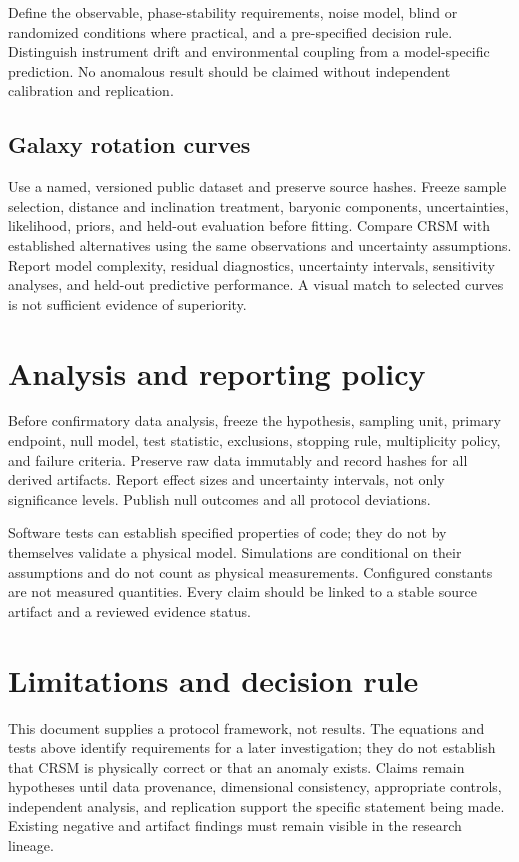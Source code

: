 \documentclass[aps,preprint,superscriptaddress,longbibliography]{revtex4-2}
\begin{document}
Define the observable, phase-stability requirements, noise model, blind or
randomized conditions where practical, and a pre-specified decision rule.
Distinguish instrument drift and environmental coupling from a model-specific
prediction. No anomalous result should be claimed without independent
calibration and replication.

\subsection{Galaxy rotation curves}

Use a named, versioned public dataset and preserve source hashes. Freeze
sample selection, distance and inclination treatment, baryonic components,
uncertainties, likelihood, priors, and held-out evaluation before fitting.
Compare CRSM with established alternatives using the same observations and
uncertainty assumptions. Report model complexity, residual diagnostics,
uncertainty intervals, sensitivity analyses, and held-out predictive
performance. A visual match to selected curves is not sufficient evidence
of superiority.

\section{Analysis and reporting policy}

Before confirmatory data analysis, freeze the hypothesis, sampling unit,
primary endpoint, null model, test statistic, exclusions, stopping rule,
multiplicity policy, and failure criteria. Preserve raw data immutably and
record hashes for all derived artifacts. Report effect sizes and uncertainty
intervals, not only significance levels. Publish null outcomes and all
protocol deviations.

Software tests can establish specified properties of code; they do not by
themselves validate a physical model. Simulations are conditional on their
assumptions and do not count as physical measurements. Configured constants
are not measured quantities. Every claim should be linked to a stable source
artifact and a reviewed evidence status.

\section{Limitations and decision rule}

This document supplies a protocol framework, not results. The equations and
tests above identify requirements for a later investigation; they do not
establish that CRSM is physically correct or that an anomaly exists. Claims
remain hypotheses until data provenance, dimensional consistency,
appropriate controls, independent analysis, and replication support the
specific statement being made. Existing negative and artifact findings must
remain visible in the research lineage.
\end{document}
